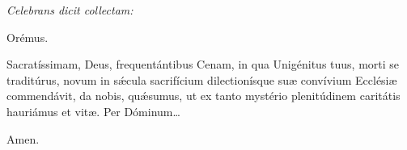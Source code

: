 \textit{Celebrans dicit collectam:}

\Vbardot{} Orémus.

Sacratíssimam, Deus, frequentántibus Cenam, in qua Unigénitus tuus, morti se traditúrus, novum in sǽcula sacrifícium dilectionísque suæ convívium Ecclésiæ commendávit,
da nobis, quǽsumus, ut ex tanto mystério plenitúdinem caritátis hauriámus et vitæ. Per Dóminum…

\Rbardot{} Amen.
